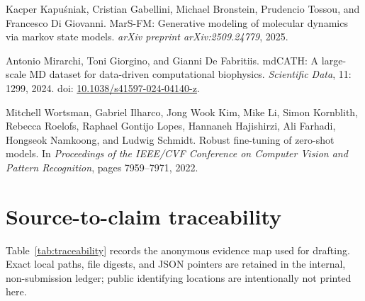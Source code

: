 \documentclass{article}
\providecommand{\doi}[1]{doi: \begingroup\urlstyle{rm}\url{#1}\endgroup}
\begin{document}
\begin{thebibliography}{}

Kacper Kapu\'sniak, Cristian Gabellini, Michael Bronstein, Prudencio Tossou, and Francesco Di Giovanni.
\newblock MarS-FM: Generative modeling of molecular dynamics via markov state models.
\newblock \emph{arXiv preprint arXiv:2509.24779}, 2025.

Antonio Mirarchi, Toni Giorgino, and Gianni De Fabritiis.
\newblock mdCATH: A large-scale MD dataset for data-driven computational biophysics.
\newblock \emph{Scientific Data}, 11: 1299, 2024.
\newblock \doi{10.1038/s41597-024-04140-z}.

Mitchell Wortsman, Gabriel Ilharco, Jong Wook Kim, Mike Li, Simon Kornblith, Rebecca Roelofs, Raphael Gontijo Lopes, Hannaneh Hajishirzi, Ali Farhadi, Hongseok Namkoong, and Ludwig Schmidt.
\newblock Robust fine-tuning of zero-shot models.
\newblock In \emph{Proceedings of the IEEE/CVF Conference on Computer Vision and Pattern Recognition}, pages 7959--7971, 2022.

\end{thebibliography}


\appendix

\section{Source-to-claim traceability}
\label{app:traceability}

Table~\ref{tab:traceability} records the anonymous evidence map used for drafting. Exact local paths, file digests, and JSON pointers are retained in the internal, non-submission ledger; public identifying locations are intentionally not printed here.
\end{document}
